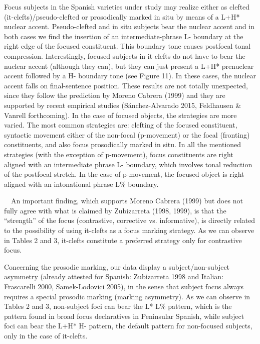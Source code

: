 \documentclass[11pt]{article}
\newenvironment{styleStandard}{\setlength\leftskip{0cm}\setlength\rightskip{0cm plus 1fil}\setlength\parindent{0cm}\setlength\parfillskip{0pt plus 1fil}\setlength\parskip{0in plus 1pt}\writerlistparindent\writerlistleftskip\leavevmode\normalfont\normalsize\writerlistlabel\ignorespaces}{\unskip\vspace{0.139in plus 0.0139in}\par}
\newcommand\writerlistleftskip{}
\newcommand\writerlistparindent{}
\newcommand\writerlistlabel{}
\begin{document}
\begin{styleStandard}
Focus subjects in the Spanish varieties under study may realize either as clefted (it-clefts)/pseudo-clefted or prosodically marked in situ by means of a L+H* nuclear accent. Pseudo-clefted and in situ subjects bear the nuclear accent and in both cases we find the insertion of an intermediate-phrase L- boundary at the right edge of the focused constituent. This boundary tone causes postfocal tonal compression. Interestingly, focused subjects in it-clefts do not have to bear the nuclear accent (although they can), but they can just present a L+H* prenuclear accent followed by a H- boundary tone (see Figure 11). In these cases, the nuclear accent falls on final-sentence position. These results are not totally unexpected, since they follow the prediction by Moreno Cabrera (1999) and they are supported by recent empirical studies (Sánchez-Alvarado 2015, Feldhausen \& Vanrell forthcoming). In the case of focused objects, the strategies are more varied. The most common strategies are: clefting of the focused constituent, syntactic movement either of the non-focal (p-movement) or the focal (fronting) constituents, and also focus prosodically marked in situ. In all the mentioned strategies (with the exception of p-movement), focus constituents are right aligned with an intermediate phrase L- boundary, which involves tonal reduction of the postfocal stretch. In the case of p-movement, the focused object is right aligned with an intonational phrase L\% boundary.
\end{styleStandard}


\begin{styleStandard}
\ \ An important finding, which supports Moreno Cabrera (1999) but does not fully agree with what is claimed by Zubizarreta (1998, 1999), is that the “strength” of the focus (contrastive, corrective vs. informative), is directly related to the possibility of using it-clefts as a focus marking strategy. As we can observe in Tables 2 and 3, it-clefts constitute a preferred strategy only for contrastive focus.
\end{styleStandard}


\begin{styleStandard}
Concerning the prosodic marking, our data display a subject/non-subject asymmetry (already attested for Spanish: Zubizarreta 1998 and Italian: Frascarelli 2000, Samek-Lodovici 2005), in the sense that subject focus always requires a special prosodic marking (marking asymmetry). As we can observe in Tables 2 and 3, non-subject foci can bear the L* L\% pattern, which is the pattern found in broad focus declaratives in Peninsular Spanish, while subject foci can bear the L+H* H- pattern, the default pattern for non-focused subjects, only in the case of it-clefts. 
\end{styleStandard}
\end{document}
